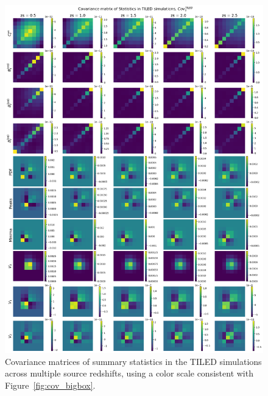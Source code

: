 \begin{figure}[p]
    \centering
    \includegraphics[width=\textwidth]{figures/results/cov_tiled.png}
    \caption[Covariance Matrices of summary statistics in TILED Simulations]{Covariance matrices of summary statistics in the TILED simulations across multiple source redshifts, using a color scale consistent with Figure~\ref{fig:cov_bigbox}.}
    \label{fig:cov_tiled}
\end{figure}

